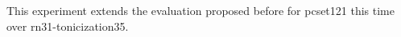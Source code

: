 
This experiment extends the evaluation proposed before for
\gls{pcset121} this time over
\gls{rn31}-\gls{tonicization35}.

